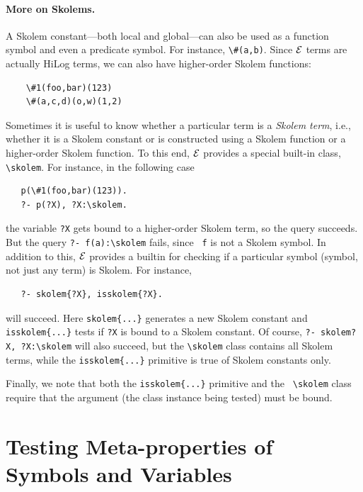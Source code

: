 \documentclass[11pt]{article}
\newcommand{\ERGO}{\mbox{\ensuremath{\cal{E}}\smaller{{\sc{RGO}}}}\xspace}
\newcommand{\FLSYSTEM}{\ERGO}
\newcommand{\bs}{\textbackslash}
\begin{document}
\paragraph{More on Skolems.}
A Skolem constant---both local and global---can also be used as a function symbol and even a
predicate symbol.
For instance,
{\tt \bs{}\#(a,b)}. Since \FLSYSTEM terms are actually HiLog terms, we can also
have higher-order Skolem functions:
\begin{verbatim}
    \#1(foo,bar)(123)
    \#(a,c,d)(o,w)(1,2)
\end{verbatim}
\index{\bs{}skolem class}
Sometimes it is useful to know whether a particular term
is a \emph{Skolem term}, i.e., whether it is a Skolem constant or is
constructed using a Skolem function or a higher-order Skolem function.
To this end, \FLSYSTEM provides a special built-in class, {\tt \bs{}skolem}. 
For instance, in the following case
\begin{verbatim}
   p(\#1(foo,bar)(123)).
   ?- p(?X), ?X:\skolem.
\end{verbatim}
the variable {\tt ?X} gets bound to a higher-order Skolem term, so 
the query succeeds. But the query {\tt ?- f(a):\bs{}skolem} fails, since {\tt
  f} is not a Skolem symbol.  
In addition to this, \FLSYSTEM provides a builtin for checking if a particular
symbol (symbol, not just any term) is Skolem. For instance,
\begin{verbatim}
   ?- skolem{?X}, isskolem{?X}.
\end{verbatim}
will succeed.
Here \texttt{skolem\{...\}} generates a new Skolem constant and
\texttt{isskolem\{...\}} tests if \texttt{?X} is bound to a Skolem constant.   
Of course, {\tt ?- skolem{?X}, ?X:\bs{}skolem}   
will also succeed, but the {\tt \bs{}skolem} class contains all Skolem terms,
while the {\tt isskolem\{...\}} primitive is true of Skolem constants only.

Finally, we note that both the {\tt isskolem\{...\}} primitive and the {\tt
  \bs{}skolem} class require that the argument (the class
instance being tested) must be bound.


\section{Testing Meta-properties of Symbols and Variables}
\end{document}
